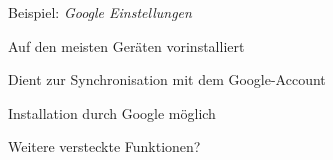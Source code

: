 \begin{frame}
	\centering
	Beispiel: \textit{Google Einstellungen}
    		\begin{block}{}
				Auf den meisten Geräten vorinstalliert
			\end{block}
			\begin{block}{}
				Dient zur Synchronisation mit dem Google-Account
			\end{block}
			\begin{block}{}
				Installation durch Google möglich
			\end{block}
			\begin{block}{}
				Weitere versteckte Funktionen?
			\end{block}
\end{frame}